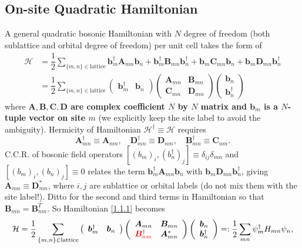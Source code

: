 \documentclass[10pt,nofootinbib]{revtex4}
\begin{document}
	\subsection{On-site Quadratic Hamiltonian}
		A general quadratic bosonic Hamiltonian with $N$ degree of freedom (both sublattice and orbital degree of freedom) per unit cell takes the form of
		\begin{align}\label{1.1.1}
			\mathcal{H}&=\dfrac{1}{2}\sum_{\{m,n\}\in\text{lattice}}\bm{b}^\dagger_m \bm{A}_{mn}\bm{b}_n+\bm{b}_m^\dagger \bm{B}_{mn}\bm{b}_n^\dagger+\bm{b}_m \bm{C}_{mn}\bm{b}_n+\bm{b}_m\bm{D}_{mn}\bm{b}_n^\dagger\nonumber\\
			&=\dfrac{1}{2}\sum_{\{m,n\}\in\text{lattice}}\left(\begin{array}{cc}
				\bm{b}_m^\dagger&\bm{b}_n
			\end{array}\right)\left(\begin{array}{cc}
				\bm{A}_{mn}&\bm{B}_{mn}\\\bm{C}_{mn}&\bm{D}_{mn}
			\end{array}\right)\left(\begin{array}{c}
				\bm{b}_n\\\bm{b}_n^\dagger
			\end{array}\right) 
		\end{align}
		where \textbf{$\bm{A},\bm{B},\bm{C},\bm{D}$ are complex coefficient $N$ by $N$ matrix and $\bm{b}_m$ is a $N$-tuple vector on site $m$} (we explicitly keep the site label to avoid the ambiguity). Hermicity of Hamiltonian $\mathcal{H}^\dagger\equiv \mathcal{H}$ requires
		\begin{equation*}
			\bm{A}_{mn}^\dagger\equiv\bm{A}_{nm},\quad \bm{D}_{mn}^\dagger\equiv\bm{D}_{nm},\quad\bm{B}_{mn}^\dagger\equiv\bm{C}_{nm}.
		\end{equation*}
		C.C.R. of bosonic field operators $[(b_m)_i,(b_n^\dagger)_j]\equiv\delta_{ij}\delta_{mn}$ and $[(b_m)_i,(b_n)_j]\equiv0$ relates the term $\bm{b}_m^\dagger \bm{A}_{mn}\bm{b}_{n}$ with $\bm{b}_m\bm{D}_{mn}\bm{b}_n^\dagger$, giving $\bm{A}_{mn}\equiv\bm{D}_{mn}^*$, where $i,j$ are sublattice or orbital labels (do not mix them with the site label!). Ditto for the second and third terms in Hamiltonian so that $\mathbf{B}_{mn}=\mathbf{B}_{nm}^T$. So Hamiltonian \eqref{1.1.1} becomes
		\begin{equation}\label{1.1.2}
			\mathcal{H}=\dfrac{1}{2}\sum_{\{m,n\}\in\text{lattice}}\left(\begin{array}{cc}
				\bm{b}_m^\dagger&\bm{b}_n
			\end{array}\right) \left(\begin{array}{cc}
				\bm{A}_{mn}&\bm{B}_{mn}\\{\color{red}\bm{B}_{nm}^\dagger}&\bm{A}_{mn}^*
			\end{array}\right)\left(\begin{array}{c}
				\bm{b}_n\\\bm{b}_n^\dagger
			\end{array}\right)=:\dfrac{1}{2}\sum_{mn}\psi_m^\dagger H_{mn}\psi_n,
		\end{equation}
\end{document}
